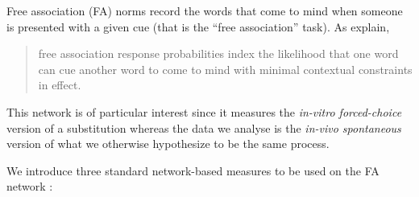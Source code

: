 Free association (FA) norms record the words that come to mind when someone is presented with a given cue (that is the ``free association'' task).
As \citeauthor{Nelson04} explain,
\begin{quote}
free association response probabilities index the likelihood that one word can cue another word to come to mind with minimal contextual constraints in effect.~\citep{Nelson04}
\end{quote}
This network is of particular interest since it measures the \emph{in-vitro forced-choice} version of a substitution whereas the data we analyse is the \emph{in-vivo spontaneous} version of what we otherwise hypothesize to be the same process.

\bigskip
We introduce three standard network-based measures to be used on the FA network%
:

